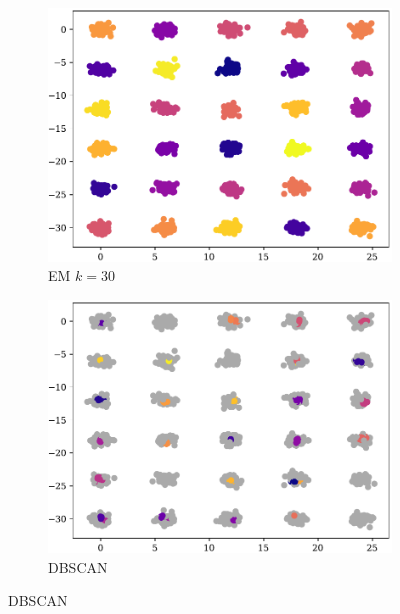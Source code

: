 \begin{figure}[t!]
    \begin{subfigure}[b]{0.45\textwidth}
        \includegraphics[width=\textwidth]{../plots/30-30-6_pred_em.pdf}
        \caption{EM $k = 30$}
        \label{subfig:30-30-6-em}
    \end{subfigure}
    \hspace{0.09\textwidth}
    \begin{subfigure}[b]{0.45\textwidth}
        \includegraphics[width=\textwidth]{../plots/30-30-6_pred_dbscan.pdf}
        \caption{DBSCAN}
        \label{subfig:30-30-6-dbscan}
    \end{subfigure}
\end{figure}
